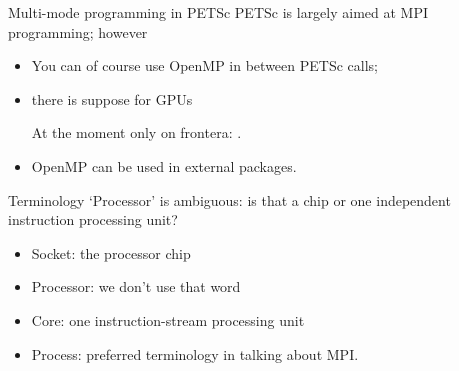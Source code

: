 




\begin{frame}{Multi-mode programming in PETSc}
  PETSc is largely aimed at MPI programming; however
  \begin{itemize}
  \item You can of course use OpenMP in between PETSc calls;
  \item there is suppose for GPUs
\begin{taccnote}
At the moment only on frontera: .
\end{taccnote}
  \item OpenMP can be used in external packages.
  \end{itemize}
\end{frame}

\begin{frame}{Terminology}
  `Processor' is ambiguous: is that a chip or one independent
  instruction processing unit?
  \begin{itemize}
  \item Socket: the processor chip
  \item Processor: we don't use that word
  \item Core: one instruction-stream processing unit
  \item Process: preferred terminology in talking about MPI.
  \end{itemize}  
\end{frame}

